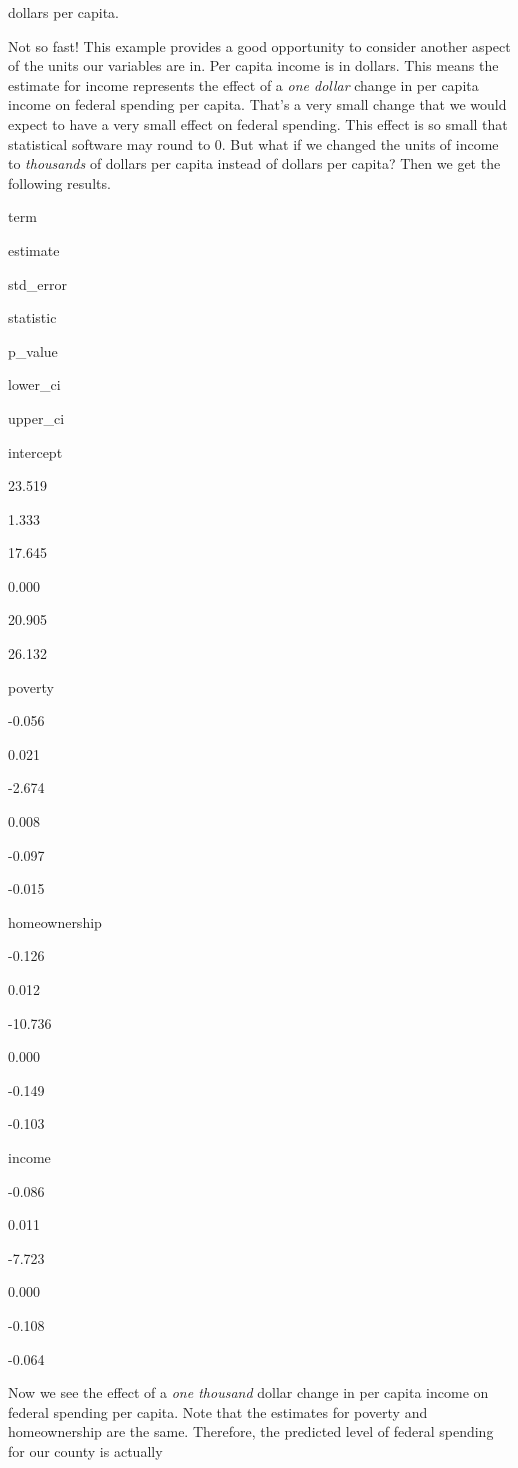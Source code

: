 \documentclass[
]{book}
\begin{document}
dollars per capita.

Not so fast! This example provides a good opportunity to consider another aspect of the units our variables are in. Per capita income is in dollars. This means the estimate for income represents the effect of a \emph{one dollar} change in per capita income on federal spending per capita. That's a very small change that we would expect to have a very small effect on federal spending. This effect is so small that statistical software may round to 0. But what if we changed the units of income to \emph{thousands} of dollars per capita instead of dollars per capita? Then we get the following results.

term

estimate

std\_error

statistic

p\_value

lower\_ci

upper\_ci

intercept

23.519

1.333

17.645

0.000

20.905

26.132

poverty

-0.056

0.021

-2.674

0.008

-0.097

-0.015

homeownership

-0.126

0.012

-10.736

0.000

-0.149

-0.103

income

-0.086

0.011

-7.723

0.000

-0.108

-0.064

Now we see the effect of a \emph{one thousand} dollar change in per capita income on federal spending per capita. Note that the estimates for poverty and homeownership are the same. Therefore, the predicted level of federal spending for our county is actually
\end{document}
